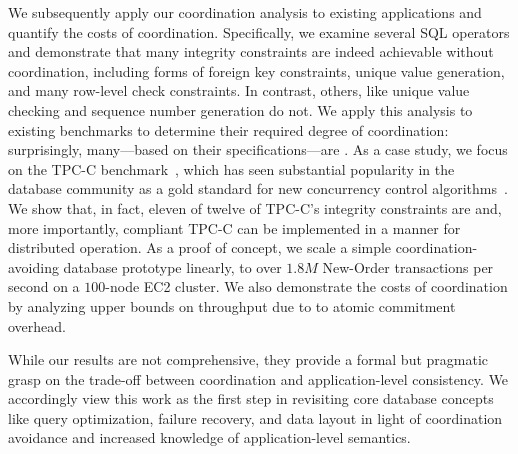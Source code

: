 
We subsequently apply our \iconfluence coordination analysis to
existing applications and quantify the costs of
coordination. Specifically, we examine several SQL operators and
demonstrate that many integrity constraints are indeed achievable
without coordination, including forms of foreign key constraints,
unique value generation, and many row-level check constraints. In
contrast, others, like unique value checking and sequence number
generation do not. We apply this analysis to existing benchmarks to
determine their required degree of coordination: surprisingly,
many---based on their specifications---are \cfree. As a case study, we
focus on the TPC-C benchmark~\cite{tpcc}, which has seen substantial
popularity in the database community as a gold standard for new
concurrency control
algorithms~\cite{abadi-vll,jones-dtxn,schism,calvin,hstore}. We show
that, in fact, eleven of twelve of TPC-C's integrity constraints are
\iconfluent and, more importantly, compliant TPC-C can be implemented
in a \cfree manner for distributed operation. As a proof of concept,
we scale a simple coordination-avoiding database prototype linearly,
to over $1.8M$ New-Order transactions per second on a $100$-node EC2
cluster. We also demonstrate the costs of coordination by analyzing
upper bounds on throughput due to to atomic commitment overhead.

While our results are not comprehensive, they provide a formal but
pragmatic grasp on the trade-off between coordination and
application-level consistency. We accordingly view this work as the
first step in revisiting core database concepts like query
optimization, failure recovery, and data layout in light of
coordination avoidance and increased knowledge of application-level
semantics.


